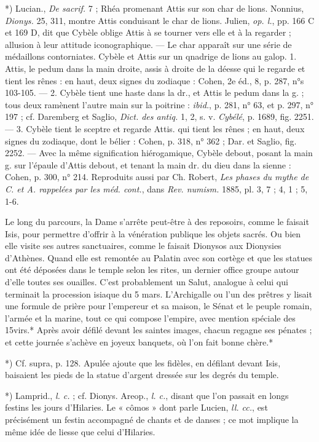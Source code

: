 \documentclass[a4paper, 11pt, oneside, polutonikogreek, french]{article}
\begin{document}
*) Lucian., \emph{De sacrif.} 7 ; Rhéa promenant Attis sur son char de lions. Nonnius, \emph{Dionys.} 25, 311, montre Attis conduisant le char de lions. Julien, \emph{op. l.}, pp. 166 C et 169 D, dit que Cybèle oblige Attis à se tourner vers elle et à la regarder ; allusion à leur attitude iconographique. --- Le char apparaît sur une série de médaillons contorniates. Cybèle et Attis sur un qnadrige de lions au galop. 1. Attis, le pedum dans la main droite, assis à droite de la déesse qui le regarde et tient les rênes : en haut, deux signes du zodiaque : Cohen, 2e éd., 8, p. 287, n°s 103-105. --- 2. Cybèle tient une haste dans la dr., et Attis le pedum dans la g. ; tous deux ramènent l'autre main sur la poitrine : \emph{ibid.}, p. 281, n° 63, et p. 297, n° 197 ; cf. Daremberg et Saglio, \emph{Dict. des antiq.} 1, 2, s. v. \emph{Cybélé}, p. 1689, fig. 2251. --- 3. Cybèle tient le sceptre et regarde Attis. qui tient les rênes ; en haut, deux signes du zodiaque, dont le bélier : Cohen, p. 318, n° 362 ; Dar. et Saglio, fig. 2252. --- Avec la même signification hiérogamique, Cybèle debout, posant la main g. sur l'épaule d'Attis debout, et tenant la main dr. du dieu dans la sienne : Cohen, p. 300, n° 214. Reproduits aussi par Ch. Robert, \emph{Les phases du mythe de C. et A. rappelées par les méd. cont.}, dans \emph{Rev. numism.} 1885, pl. 3, 7 ; 4, 1 ; 5, 1-6.

Le long du parcours, la Dame s'arrête peut-être à des reposoirs, comme le faisait Isis, pour permettre d'offrir à la vénération publique les objets sacrés. Ou bien elle visite ses autres sanctuaires, comme le faisait Dionysos aux Dionysies d'Athènes. Quand elle est remontée au Palatin avec son cortège et que les statues ont été déposées dans le temple selon les rites, un dernier office groupe autour d'elle toutes ses ouailles. C'est probablement un Salut, analogue à celui qui terminait la procession isiaque du 5 mars. L'Archigalle ou l'un des prêtres y lisait une formule de prière pour l'empereur et sa maison, le Sénat et le peuple romain, l'armée et la marine, tout ce qui compose l'empire, avec mention spéciale des 15virs.* Après avoir défilé devant les saintes images, chacun regagne ses pénates ; et cette journée s'achève en joyeux banquets, où l'on fait bonne chère.*

*) Cf. supra, p. 128. Apulée ajoute que les fidèles, en défilant devant Isis, baisaient les pieds de la statue d'argent dressée sur les degrés du temple.

*) Lamprid., \emph{l. c.} ; cf. Dionys. Areop., \emph{l. c.}, disant que l'on passait en longs festins les jours d'Hilaries. Le « cômos » dont parle Lucien, \emph{ll. cc.}, est précisément un festin accompagné de chants et de danses ; ce mot implique la même idée de liesse que celui d'Hilaries.
\end{document}
